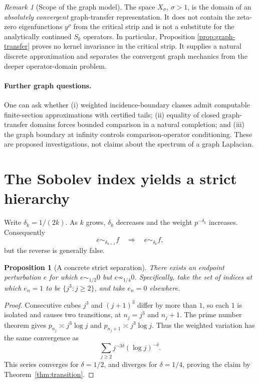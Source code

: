 \documentclass[12pt,letterpaper]{article}
\newtheorem{proposition}[theorem]{Proposition}
\numberwithin{equation}{section}
\theoremstyle{remark}
\newtheorem{remark}[theorem]{Remark}
\begin{document}
\begin{remark}[Scope of the graph model]
The space \(X_\sigma\), \(\sigma>1\), is the domain of an
\emph{absolutely convergent} graph-transfer representation.  It
does not contain the zeta-zero eigenfunctions \(y^\rho\) from the
critical strip and is not a substitute for the analytically
continued \(S_k\) operators.  In particular, Proposition
\ref{prop:graph-transfer} proves no kernel invariance in the
critical strip.  It supplies a natural discrete approximation
and separates the convergent graph mechanics from the deeper
operator-domain problem.
\end{remark}

\paragraph{Further graph questions.}
One can ask whether (i) weighted incidence-boundary classes
admit computable finite-section approximations with certified
tails; (ii) equality of closed graph-transfer domains forces
bounded comparison in a natural completion; and (iii) the
graph boundary at infinity controls comparison-operator
conditioning.  These are proposed investigations, not claims
about the spectrum of a graph Laplacian.

\section{The Sobolev index yields a strict hierarchy}
Write $\delta_k=1/(2k)$. As $k$ grows, $\delta_k$ decreases and the weight $p^{-\delta_k}$ increases. Consequently
\[
 e\sim_{\delta_{k+1}}f\quad\Longrightarrow\quad e\sim_{\delta_k}f,
\]
but the reverse is generally false.

\begin{proposition}[A concrete strict separation]\label{prop:strict}
There exists an endpoint perturbation $e$ for which $e\sim_{1/2}0$ but $e\not\sim_{1/4}0$. Specifically, take the set of indices at which $e_n=1$ to be $\{j^3:j\ge2\}$, and take $e_n=0$ elsewhere.
\end{proposition}
\begin{proof}
Consecutive cubes $j^3$ and $(j+1)^3$ differ by more than $1$, so each $1$ is isolated and causes two transitions, at $n_j=j^3$ and $n_j+1$. The prime number theorem gives $p_{n_j}\asymp j^3\log j$ and $p_{n_j+1}\asymp j^3\log j$. Thus the weighted variation has the same convergence as
\[
 \sum_{j\ge2}j^{-3\delta}(\log j)^{-\delta}.
\]
This series converges for $\delta=1/2$, and diverges for $\delta=1/4$, proving the claim by Theorem~\ref{thm:transition}.
\end{proof}
\end{document}
